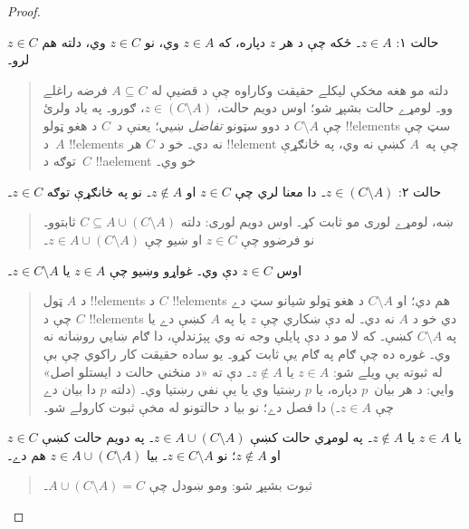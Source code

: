 \documentclass[../../../include/open-logic-section]{subfiles}
\begin{document}
\begin{proof}
\begin{quote}
  \end{quote}
  حالت ۱: $z \in A$۔ ځکه چې د هر $z$ دپاره، که $z \in A$ وي،
  نو $z \in C$ وي، دلته هم $z \in C$ لرو۔
  \begin{quote}
    دلته مو هغه مخکې ليکلے حقيقت وکاراوه چې د قضیې له
    $A \subseteq C$ فرضه راغلے وو۔ لومړے حالت بشپړ شو؛ اوس
    دويم حالت، $z \in (C
    \setminus A)$، ګورو۔ په ياد ولرئ چې $C \setminus A$ د
    دوو سټونو \emph{تفاضل} ښيي؛ يعنې د~$C$ د هغو ټولو
    !!{element}s سټ چې د~$A$ !!{element}s نه دي۔ خو د $C$
    هر !!{element} چې په~$A$ کښې نه وي، په ځانګړې توګه
    د~$C$ !!a{element} خو وي۔
  \end{quote}
  حالت ۲: $z \in (C \setminus A)$۔ دا معنا لري چې $z \in C$
  او $z \notin A$۔ نو په ځانګړې توګه $z \in C$۔
  \begin{quote}
    ښه، لومړے لوری مو ثابت کړ۔ اوس دويم لوری: دلته
    $C \subseteq A \cup (C \setminus
    A)$ ثابتوو۔ نو فرضوو چې $z \in C$ او ښيو چې
    $z \in A \cup (C \setminus A)$۔
  \end{quote}
  اوس $z \in C$ دې وي۔ غواړو وښيو چې $z \in A$ يا
  $z \in C \setminus A$۔
  \begin{quote}
    د $A$ ټول !!{element}s د $C$ !!{element}s هم دي؛ او
    $C \setminus A$ د هغو ټولو شيانو سټ دے چې د $C$
    !!{element}s دي خو د $A$ نه دي۔ له دې ښکاري چې $z$
    يا په $A$ کښې دے يا په $C
    \setminus A$ کښې۔ که لا مو د دې پايلې وجه نه وي پېژندلې،
    دا ګام ښايي روښانه نه وي۔ غوره ده چې ګام په ګام يې ثابت
    کړو۔ يو ساده حقيقت کار راکوي چې بې له ثبوته يې ويلے شو:
    $z \in A$ يا $z \notin A$۔ دې ته «د منځني حالت د ايستلو
    اصل» وايي: د هر بيان~$p$ دپاره، يا $p$ رښتيا وي يا يې نفي
    رښتيا وي۔ (دلته $p$ دا بيان دے چې $z \in A$۔) دا فصل دے؛
    نو بيا د حالتونو له مخې ثبوت کارولے شو۔
  \end{quote}
  يا $z \in A$ يا $z \notin A$۔ په لومړي حالت کښې
  $z \in A \cup
  (C \setminus A)$۔ په دويم حالت کښې $z \in C$ او
  $z \notin A$؛ نو $z \in C \setminus A$۔ بيا
  $z \in A \cup (C \setminus A)$ هم دے۔
  \begin{quote}
    ثبوت بشپړ شو: ومو ښودل چې $A \cup (C \setminus A) = C$۔
  \end{quote}
\end{proof}
\end{document}
